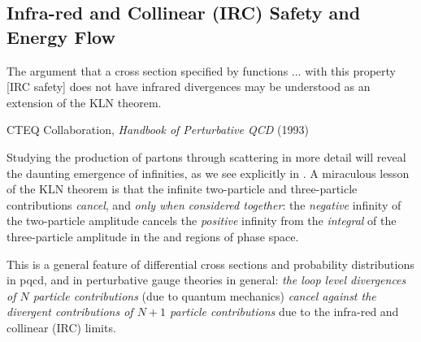 


\subsection{Infra-red and Collinear (IRC) Safety and Energy Flow}
\label{sec:irc-safety}

\epigraph{
    The argument that a cross section specified by functions \(\dots\) with this property [IRC safety] does not have infrared divergences may be understood as an extension of the KLN theorem.
}{
    CTEQ Collaboration,
    \textit{Handbook of Perturbative QCD} (1993)
}

Studying the production of partons through scattering in more detail will reveal the daunting emergence of infinities, as we see explicitly in .
%
A miraculous lesson of the KLN theorem is that the infinite two-particle and three-particle contributions \emph{cancel}, and \emph{only when considered together}:
%
the \textit{negative} infinity of the two-particle amplitude cancels the \textit{positive} infinity from the \textit{integral} of the three-particle amplitude in the  and  regions of phase space.

This is a general feature of differential cross sections and probability distributions in \gls{pqcd}, and in perturbative gauge theories in general:
%
\textit{the loop level divergences of \(N\) particle contributions} (due to quantum mechanics) \textit{cancel against the divergent contributions of \(N+1\) particle contributions} due to the infra-red and collinear (IRC) limits.

